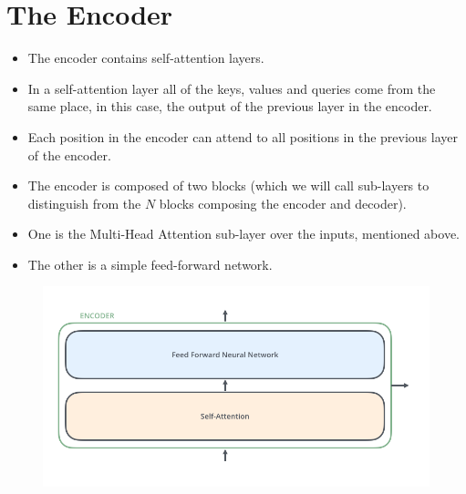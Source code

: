 \section{The Encoder}
\begin{itemize}
\item The encoder contains self-attention layers. 

\item In a self-attention layer all of the keys, values and queries come from the same place, in this case, the output of the previous layer in the encoder. 

\item Each position in the encoder can attend to all positions in the previous layer of the encoder.

 \item  The encoder is composed of two blocks (which we will call sub-layers to distinguish from the $N$ blocks composing the encoder and decoder).
\item  One is the Multi-Head Attention sub-layer over the inputs, mentioned above. 
\item The other is a simple feed-forward network. 

\end{itemize}

     \begin{figure}[h]
        	\includegraphics[scale = 0.35]{pics/Transformer_encoder.png}
        \end{figure}  


